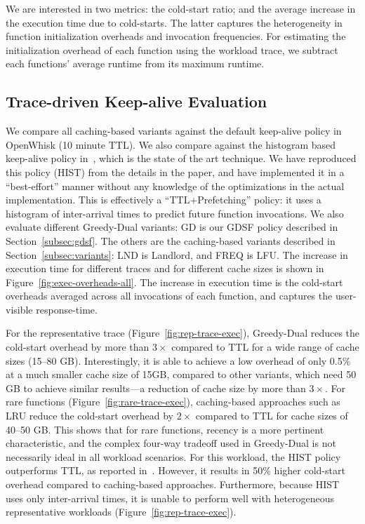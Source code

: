 We are interested in two metrics: the cold-start ratio; and the average increase in the execution time due to cold-starts. 
The latter captures the heterogeneity in function initialization overheads and invocation frequencies. 
For estimating the initialization overhead of each function using the workload trace, we subtract each functions' average runtime from its maximum runtime. 

\subsection{Trace-driven Keep-alive Evaluation}
\vspace*{\subsecspace}

We compare all caching-based variants against the default keep-alive policy in OpenWhisk (10 minute TTL). 
We also compare against the histogram based keep-alive policy in~\cite{shahrad_serverless_2020}, which is the state of the art technique. 
We have reproduced this policy (HIST) from the details in the paper, and have implemented it in a ``best-effort'' manner without any knowledge of the optimizations in the actual implementation. 
This is effectively a ``TTL+Prefetching'' policy: it uses a histogram of inter-arrival times to predict future function invocations. 
We also evaluate different Greedy-Dual variants: GD is our GDSF policy described in Section~\ref{subsec:gdsf}.
The others are the caching-based variants described in Section~\ref{subsec:variants}: LND is Landlord, and FREQ is LFU. 
%
The increase in execution time for different traces and for different cache sizes is shown in Figure~\ref{fig:exec-overheads-all}.
The increase in execution time is the cold-start overheads averaged across all invocations of each function, and captures the user-visible response-time. 
%

For the representative trace (Figure~\ref{fig:rep-trace-exec}), Greedy-Dual reduces the cold-start overhead by more than $3\times$ compared to TTL for a wide range of cache sizes (15--80 GB). 
Interestingly, it is able to achieve a low overhead of only 0.5\% at a much smaller cache size of 15GB, compared to other variants, which need 50 GB to achieve similar results---a reduction of cache size by more than $3\times$. 
%
For rare functions (Figure~\ref{fig:rare-trace-exec}), caching-based approaches such as LRU  reduce the cold-start overhead by $2\times$ compared to TTL for cache sizes of 40--50 GB. 
This shows that for rare functions, recency is a more pertinent characteristic, and the complex four-way tradeoff used in Greedy-Dual is not necessarily ideal in all workload scenarios. 
For this workload, the HIST policy outperforms TTL, as reported in~\cite{shahrad_serverless_2020}. 
However, it results in 50\% higher cold-start overhead compared to caching-based approaches.
Furthermore, because HIST uses only inter-arrival times, it is unable to perform well with heterogeneous representative workloads  (Figure~\ref{fig:rep-trace-exec}). 


